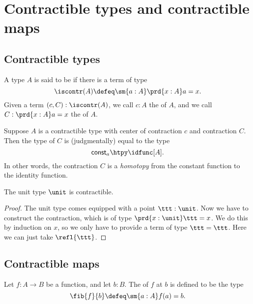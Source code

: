\chapter{Contractible types and contractible maps}

\section{Contractible types}
\begin{defn}
A type $A$ is said to be  if there is a term of type
\begin{equation*}
\iscontr(A) \defeq \sm{a:A}\prd{x:A}a=x.
\end{equation*}
Given a term $(c,C):\iscontr(A)$, we call $c:A$ the  of $A$, and we call $C:\prd{x:A}a=x$ the  of $A$.
\end{defn}

\begin{rmk}
Suppose $A$ is a contractible type with center of contraction $c$ and contraction $C$. Then the type of $C$ is (judgmentally) equal to the type
\begin{equation*}
\mathsf{const}_a\htpy\idfunc[A].
\end{equation*}
In other words, the contraction $C$ is a \emph{homotopy} from the constant function to the identity function.
\end{rmk}

\begin{thm}
The unit type $\unit$ is contractible.
\end{thm}

\begin{proof}
The unit type comes equipped with a point $\ttt:\unit$. Now we have to construct the contraction, which is of type $\prd{x:\unit}\ttt=x$. We do this by induction on $x$, so we only have to provide a term of type $\ttt=\ttt$. Here we can just take $\refl{\ttt}$. 
\end{proof}

\section{Contractible maps}
\begin{defn}
Let $f:A\to B$ be a function, and let $b:B$. The  of $f$ at $b$ is defined to be the type
\begin{equation*}
\fib{f}{b}\defeq\sm{a:A}f(a)=b.
\end{equation*}
\end{defn}


